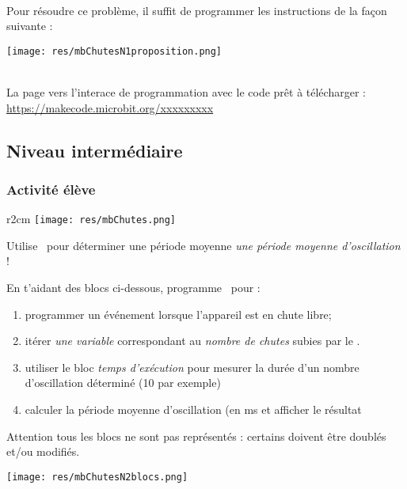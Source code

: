 \begin{minipage}[t]{0.6\linewidth}
    \begin{methode}~\\
        Pour résoudre ce problème, il suffit de programmer les instructions de la façon suivante :
        
        \texttt{[image: res/mbChutesN1proposition.png]}
    \end{methode}
\end{minipage}
\hfill
\begin{minipage}[t]{0.4\linewidth}
    \begin{remarque}~\\
    La page vers l'interace de programmation avec le code prêt à télécharger :\\ \url{https://makecode.microbit.org/xxxxxxxxx}
    \end{remarque}
\end{minipage}

%
%
\newpage
\subsection{Niveau intermédiaire}
\subsubsection{Activité élève}


\begin{wrapfigure}{r}{2cm}
    \texttt{[image: res/mbChutes.png]}
\end{wrapfigure}
\begin{eleve}
Utilise \mb~pour déterminer une période moyenne \emph{une période moyenne d'oscillation} !

En t'aidant des blocs ci-dessous, programme \mb~pour : 
\begin{enumerate}
    \item programmer un événement lorsque l'appareil est en chute libre;
    \item itérer \emph{une variable} correspondant au \emph{nombre de chutes} subies par le \mb.
    \item utiliser le bloc \emph{temps d'exécution} pour mesurer la durée d'un nombre d'oscillation déterminé (10 par exemple)
    \item calculer la période moyenne d'oscillation (en ms et afficher le résultat
\end{enumerate}
Attention tous les blocs ne sont pas représentés : certains doivent être doublés et/ou modifiés.

\begin{center}
    \texttt{[image: res/mbChutesN2blocs.png]}
\end{center}

\end{eleve}

